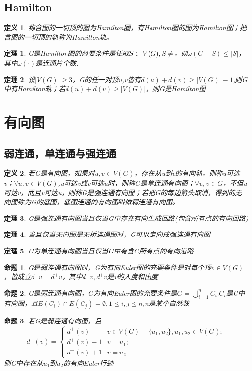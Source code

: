 \documentclass[UTF8]{ctexart}
\newtheorem{dfnt}{定义}
\newtheorem{thr}{定理}
\newtheorem{pro}{命题}
\begin{document}
\subsection{Hamilton}
\begin{dfnt}
称含图的一切顶的圈为Hamilton圈，有Hamilton圈的图为Hamilton图；把含图的一切顶的轨称为Hamilton轨。
\end{dfnt}
\begin{thr}
G是Hamilton图的必要条件是任取$S \subset V(G),S\neq \empty$，则$\omega(G-S) \leq |S|$，其中$\omega (\cdot)$是连通片个数.
\end{thr}
\begin{thr}
设$|V(G)| \geq 3$，G的任一对顶u,v皆有$d(u)+d(v) \geq |V(G)|-1$,则G中有Hamilton轨；若$d(u) +d(v) \geq |V(G)|$，则G是Hamilton图
\end{thr}
\section{有向图}
\subsection{弱连通，单连通与强连通}
\begin{dfnt}
若G是有向图，如果对$u,v \in V(G)$，存在从u到v的有向轨，则称u可达v；$\forall u,v \in V(G)$,u可达v或v可达u时，则称G是单连通有向图；$\forall u,v \in G$，不但u可达v，而且v可达u，则称G是强连通有向图；若把G的每边箭头取消，得到的无向图称为G的底图，底图连通的有向图叫做弱连通有向图。
\end{dfnt}
\begin{thr}
G是强连通有向图当且仅当G中存在有向生成回路(包含所有点的有向回路)
\end{thr}
\begin{thr}
当且仅当无向图是无桥连通图时，G可以定向成强连通有向图
\end{thr}
\begin{thr}
G为单连通有向图当且仅当G中有含G所有点的有向道路
\end{thr}
\begin{pro}
G是弱连通有向图时，G为有向Euler图的充要条件是对每个顶$v \in V(G)$，皆成立$d^-{v}=d^+{v}$，其中$d^-{v},d^+{v}$是v的入度和出度
\end{pro}
\begin{pro}
G是弱连通有向图，G为有向Euler图的充要条件是$G = \bigcup \limits_{i=1}^n C_i$,$C_i$是G中有向圈，且$E(C_i)\cap E(C_j)=\emptyset , 1\leq i,j \leq n$,n是某个自然数
\end{pro}
\begin{pro}
若G是弱连通有向图，且
\[d^-(v)=\left \{ \begin{array}{ll} d^+(v) & v\in V(G) - \{u_1,u_2\},u_1,u_2 \in V(G);\\d^+(v) -1 &v = u_1;\\d^-(v) +1 &v = u_2 \end{array}\right.\]
则G中存在从$u_1$到$u_2$的有向Euler行迹
\end{pro}
\end{document}
